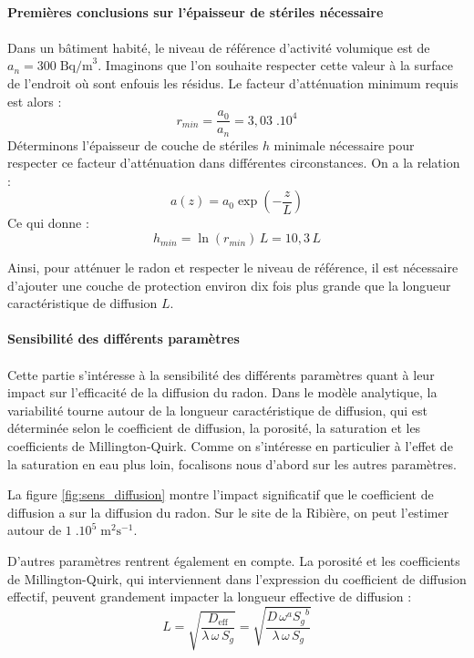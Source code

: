 \documentclass{article}
\begin{document}
\paragraph{Premières conclusions sur l'épaisseur de stériles nécessaire}

\paragraph{} Dans un bâtiment habité, le niveau de référence d’activité volumique est de $a_n=300 \; \text{Bq/m}^3$. Imaginons que l’on souhaite respecter cette valeur à la surface de l’endroit où sont enfouis les résidus. Le facteur d’atténuation minimum requis est alors :
$$
r_{min}=\frac{a_0}{a_n} =3,03 \; .10^4
$$
Déterminons l’épaisseur de couche de stériles $h$ minimale nécessaire pour respecter ce facteur d’atténuation dans différentes circonstances. On a la relation :
$$
a(z)=a_0 \exp(-\frac{z}{L})
$$
Ce qui donne :
$$
h_{min}=\ln(r_{min}) \,L =10,3 \,L 
$$

Ainsi, pour atténuer le radon et respecter le niveau de référence, il est nécessaire d’ajouter une couche de protection environ dix fois plus grande que la longueur caractéristique de diffusion $L$.

\paragraph{Sensibilité des différents paramètres}
\paragraph{} Cette partie s'intéresse à la sensibilité des différents paramètres quant à leur impact sur l'efficacité de la diffusion du radon. Dans le modèle analytique, la variabilité tourne autour de la longueur caractéristique de diffusion, qui est déterminée selon le coefficient de diffusion, la porosité, la saturation et les coefficients de Millington-Quirk. Comme on s'intéresse en particulier à l'effet de la saturation en eau plus loin, focalisons nous d'abord sur les autres paramètres.

La figure \ref{fig:sens_diffusion} montre l'impact significatif que le coefficient de diffusion a sur la diffusion du radon. Sur le site de la Ribière, on peut l'estimer autour de $1 \; .10^5 \; \text{m}^2 \text{s}^{-1}$.

D'autres paramètres rentrent également en compte. La porosité et les coefficients de Millington-Quirk, qui interviennent dans l’expression du coefficient de diffusion effectif, peuvent grandement impacter la longueur effective de diffusion :
$$
L=\sqrt{\frac{D_{\text{eff}}}{\lambda \,\omega\, S_g }}=\sqrt{\frac{D \,\omega^a {S_g}^b}{\lambda\, \omega \,S_g }}
$$
\end{document}
